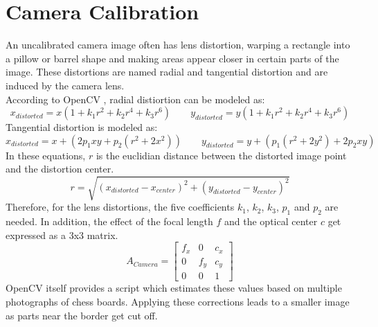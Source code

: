 \section{Camera Calibration}
\label{sec:FundCamCalibration}
An uncalibrated camera image often has lens distortion, warping a rectangle into a pillow or barrel shape and making areas appear closer in certain parts of the image. These distortions are named radial and tangential distortion and are induced by the camera lens.\\
According to OpenCV \cite{openCVCamCalib}, radial distiortion can be modeled as:
\begin{equation*}
x_{distorted} = x(1+k_{1}r^{2}+k_{2}r^{4}+k_{3}r^{6})\qquad
y_{distorted} = y(1+k_{1}r^{2}+k_{2}r^{4}+k_{3}r^{6})
\end{equation*}
Tangential distortion is modeled as\cite{openCVCamCalib}:
\begin{equation*}
    x_{distorted} = x+(2p_{1}xy+p_{2}(r^{2}+2x^{2}))\qquad
    y_{distorted} = y+(p_{1}(r^{2}+2y^{2})+2p_{2}xy)
\end{equation*}
In these equations, $r$ is the euclidian distance between the distorted image point and the distortion center.\cite{openCVCamCalib}\\
\begin{equation*}
    r=\sqrt{(x_{distorted}-x_{center})^{2}+(y_{distorted}-y_{center})^{2}}
\end{equation*}
Therefore, for the lens distortions, the five coefficients $k_{1}$, $k_{2}$, $k_{3}$, $p_{1}$ and $p_{2}$ are needed. In addition, the effect of the focal length $f$ and the optical center $c$ get expressed as a 3x3 matrix.\cite{openCVCamCalib}
\begin{equation*}
    A_{Camera}=
    \begin{bmatrix}
        f_{x} & 0 & c_{x} \\
        0 & f_{y} & c_{y} \\
        0 & 0 & 1
    \end{bmatrix}
\end{equation*}
OpenCV itself provides a script which estimates these values based on multiple photographs of chess boards. Applying these corrections leads to a smaller image as parts near the border get cut off.

